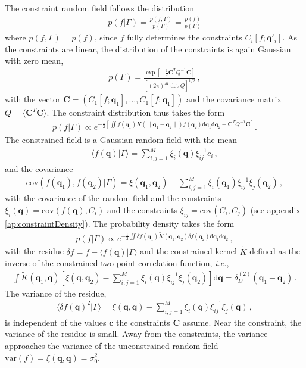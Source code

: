 \documentclass[a4paper, 11pt]{article}
\begin{document}
The constraint random field follows the distribution
\begin{align}
p(f|\Gamma) = \frac{p(f,\Gamma)}{p(\Gamma)} =\frac{p(f)}{p(\Gamma)}
\end{align}
where $p(f,\Gamma)=p(f)$, since $f$ fully determines the constraints $C_i[f;\bm{q}'_i]$. As the constraints are linear, the distribution of the constraints is again Gaussian with zero mean,
\begin{align}
p(\Gamma) = \frac{\exp\left[-\frac{1}{2} \bm{C}^T Q^{-1} \bm{C} \right]}{[(2\pi)^M \det Q]^{1/2}}\,,
\end{align}
with the vector $\bm{C}=(C_1[f;\bm{q}_1], \dots, C_1[f;\bm{q}_1])$ and the covariance matrix $Q = \langle \bm{C}^T\bm{C}\rangle.$ The constraint distribution thus takes the form
\begin{align}
p(f|\Gamma) \propto  e^{-\frac{1}{2} \left[\iint f(\bm{q}_1) K(\|\bm{q}_1 - \bm{q}_2\|) f(\bm{q}_2)\mathrm{d}\bm{q}_1 \mathrm{d}\bm{q}_2 - \bm{C}^TQ^{-1}\bm{C}\right]}.\label{eq:constraint1}
\end{align}
The constrained field is a Gaussian random field with the mean
\begin{align}
\langle f(\bm{q})|\Gamma\rangle = \sum_{i,j=1}^M\xi_i (\bm{q})\xi_{ij}^{-1}c_i\,,
\end{align}
 and the covariance
\begin{align}
\text{cov}(f(\bm{q}_1),f(\bm{q}_2)|\Gamma)  = \xi(\bm{q}_1,\bm{q}_2) - \sum_{i,j=1}^M\xi_i(\bm{q}_1)\xi_{ij}^{-1}\xi_j(\bm{q}_2)\,,
\end{align}
with the covariance of the random field and the constraints $\xi_{i}(\bm{q}) = \text{cov}( f(\bm{q}), C_i)$ and the constraints $\xi_{ij} = \text{cov}( C_i ,C_j)$ (see appendix \ref{ap:constraintDensity}). The probability density takes the form
\begin{align}
p(f|\Gamma) \propto  e^{-\frac{1}{2} \iint \delta{f}(\bm{q}_1) \tilde{K}(\bm{q}_1,\bm{q}_2) \delta f(\bm{q}_2)\mathrm{d}\bm{q}_1 \mathrm{d}\bm{q}_2 }\,,\label{eq:constraint2}
\end{align}
with the residue $\delta f = f-\langle f(\bm{q})|\Gamma\rangle$ and the constrained kernel $\tilde{K}$ defined as the inverse of the constrained two-point correlation function, \textit{i.e.},
\begin{align}
\int \tilde{K}(\bm{q}_1,\bm{q}) \left[\xi(\bm{q},\bm{q}_2) - \sum_{i,j=1}^M\xi_i(\bm{q})\xi_{ij}^{-1}\xi_j(\bm{q}_2)\right]\mathrm{d}\bm{q}= \delta_D^{(2)}(\bm{q}_1-\bm{q}_2)\,.
\end{align}
The variance of the residue,
\begin{align}
\langle \delta f(\bm{q})^2|\Gamma \rangle = \xi(\bm{q},\bm{q}) - \sum_{i,j=1}^M\xi_i(\bm{q})\xi_{ij}^{-1}\xi_j(\bm{q})\,,
\end{align}
is independent of the values $\bm{c}$ the constraints $\bm{C}$ assume. Near the constraint, the variance of the residue is small. Away from the constraints, the variance approaches the variance of the unconstrained random field $\text{var}(f)=\xi(\bm{q},\bm{q})=\sigma_0^2$.
\end{document}

